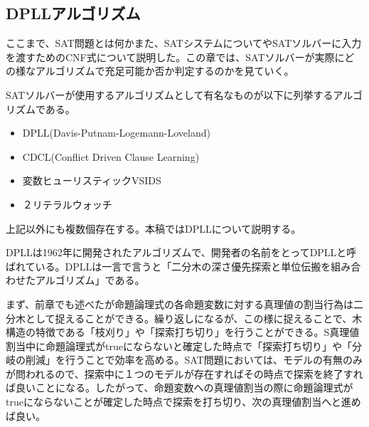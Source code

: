 \documentclass[dvipdfmx]{jsarticle}
\begin{document}
\subsection{DPLLアルゴリズム}
ここまで、SAT問題とは何かまた、SATシステムについてやSATソルバーに入力を渡すためのCNF式について説明した。この章では、SATソルバーが実際にどの様なアルゴリズムで充足可能か否か判定するのかを見ていく。\par
SATソルバーが使用するアルゴリズムとして有名なものが以下に列挙するアルゴリズムである。
\begin{itemize}
  \item DPLL(Davis-Putnam-Logemann-Loveland)
  \item CDCL(Conflict Driven Clause Learning)
  \item 変数ヒューリスティックVSIDS
  \item ２リテラルウォッチ
\end{itemize}
上記以外にも複数個存在する。本稿ではDPLLについて説明する。\par
DPLLは1962年に開発されたアルゴリズムで、開発者の名前をとってDPLLと呼ばれている。DPLLは一言で言うと「二分木の深さ優先探索と単位伝搬を組み合わせたアルゴリズム」である。\par
まず、前章でも述べたが命題論理式の各命題変数に対する真理値の割当行為は二分木として捉えることができる。繰り返しになるが、この様に捉えることで、木構造の特徴である「枝刈り」や「探索打ち切り」を行うことができる。S真理値割当中に命題論理式がtrueにならないと確定した時点で「探索打ち切り」や「分岐の削減」を行うことで効率を高める。SAT問題においては、モデルの有無のみが問われるので、探索中に１つのモデルが存在すればその時点で探索を終了すれば良いことになる。したがって、命題変数への真理値割当の際に命題論理式がtrueにならないことが確定した時点で探索を打ち切り、次の真理値割当へと進めば良い。\par
\end{document}
